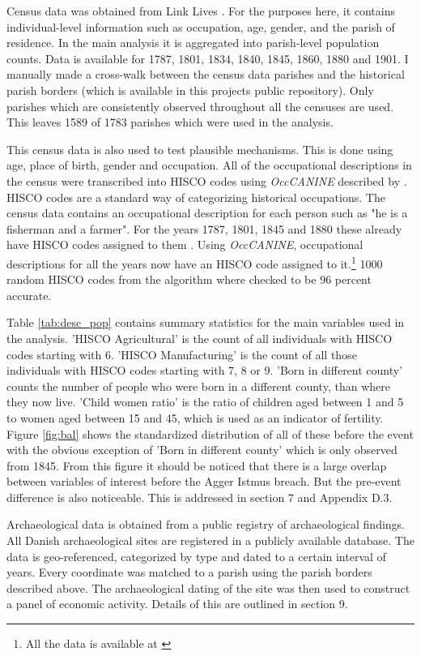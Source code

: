 \documentclass[11pt]{article}
\begin{document}
Census data was obtained from Link Lives \citep{mathiesen2022linklives}. For the purposes here, it contains individual-level information such as occupation, age, gender, and the parish of residence. In the main analysis it is aggregated into parish-level population counts. Data is available for 1787, 1801, 1834, 1840, 1845, 1860, 1880 and 1901. I manually made a cross-walk between the census data parishes and the historical parish borders (which is available in this projects public repository). Only parishes which are consistently observed throughout all the censuses are used. This leaves 1589 of 1783 parishes which were used in the analysis. 

This census data is also used to test plausible mechanisms. This is done using age, place of birth, gender and occupation. All of the occupational descriptions in the census were transcribed into HISCO codes using \textit{OccCANINE} described by \cite{dahl2024breaking}. HISCO codes are a standard way of categorizing historical occupations. The census data contains an occupational description for each person such as "he is a fisherman and a farmer". For the years 1787, 1801, 1845 and 1880 these already have HISCO codes assigned to them \citep{ddd_method2015}. Using \textit{OccCANINE}, occupational descriptions for all the years now have an HISCO code assigned to it.\footnote{All the data is available at \cite{dk_hisco_data}} 1000 random HISCO codes from the algorithm where checked to be 96 percent accurate. 

Table \ref{tab:desc_pop} contains summary statistics for the main variables used in the analysis. 'HISCO Agricultural' is the count of all individuals with HISCO codes starting with 6. 'HISCO Manufacturing' is the count of all those individuals with HISCO codes starting with 7, 8 or 9. 'Born in different county' counts the number of people who were born in a different county, than where they now live. 'Child women ratio' is the ratio of children aged between 1 and 5 to women aged between 15 and 45, which is used as an indicator of fertility. Figure \ref{fig:bal} shows the standardized distribution of all of these before the event with the obvious exception of 'Born in different county' which is only observed from 1845. From this figure it should be noticed that there is a large overlap between variables of interest before the Agger Istmus breach. But the pre-event difference is also noticeable. This is addressed in section 7 and Appendix D.3. 

Archaeological data is obtained from a public registry of archaeological findings. All Danish archaeological sites are registered in a publicly available database. The data is geo-referenced, categorized by type and dated to a certain interval of years. Every coordinate was matched to a parish using the parish borders described above. The archaeological dating of the site was then used to construct a panel of economic activity. Details of this are outlined in section 9.
\end{document}
